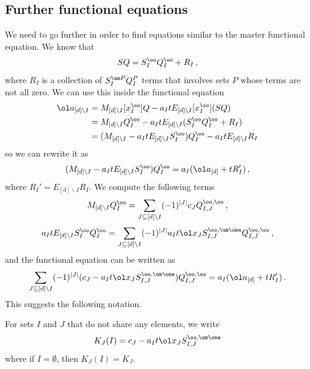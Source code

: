 \subsection{Further functional equations}
We need to go further in order to find equations similar to the master functional equation. We know that
\begin{align}
	[x_I^\oo] SQ  = S_I^\oo Q_I^\oo + R_I\,,
\end{align}
where $R_I$ is a collection of $S_I^{\um P} Q_I^{P}$ terms that involves sets $P$ whose terms are not all zero. We can use this inside the functional equation
\begin{align}\begin{split}
	\ol a_{[d]\backslash I} &= M_{[d]\backslash I}[x_I^\oo]Q- a_{I}t E_{[d]\backslash I}[x_I^\oo](SQ)\\
	& = M_{[d]\backslash I}Q_I^\oo- a_{I}t E_{[d]\backslash I}(S_I^\oo Q_I^\oo + R_I)\\
	& = (M_{[d]\backslash I} - a_{I}t E_{[d]\backslash I}S_I^\oo)Q_I^\oo  -a_{I}t E_{[d]\backslash I}R_I
\end{split}\end{align}
so we can rewrite it as
\begin{align}
	(M_{[d]\backslash I} - a_{I}t E_{[d]\backslash I}S_I^\oo)Q_I^\oo = a_I(\ol a_{[d]}+t R_I')\,,
\end{align}
where $R_I' =  E_{[d]\backslash I}R_I$. We compute the following terms
\begin{align}
	M_{[d]\backslash I}Q_I^\oo = \sum_{J \subseteq [d]\backslash I} (-1)^{|J|}c_J Q_{I,J}^{\oo,\oo}\,,
\end{align}
\begin{align}
	a_I t E_{[d]\backslash I}S_I^\oo Q_I^\oo = \sum_{J \subseteq [d]\backslash I}  (-1)^{|J|}a_I t\ol x_J S_{I,J}^{\oo,\um \one}Q_{I,J}^{\oo,\oo}\,,
\end{align}
and the functional equation can be written as
\begin{align}
	\sum_{J \subseteq [d]\backslash I}  (-1)^{|J|}(c_J - a_I t\ol x_J S_{I,J}^{\oo,\um \one})Q_{I,J}^{\oo,\oo} = a_I(\ol a_{[d]}+t R_I')\,.
\end{align}
This suggests the following notation.
\begin{definition} For sets $I$ and $J$ that do not share any elements, we write
\begin{align}
	K_J(I) = c_J - a_I t\ol x_J S_{I,J}^{\oo,\um\one}
\end{align}
where if $I = \emptyset$, then $K_J(I) = K_J$.
\end{definition}

